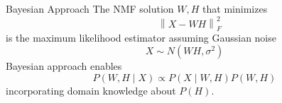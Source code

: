\documentclass[aspectratio=169]{beamer}
\begin{document}

\begin{frame}{Bayesian Approach}
	The NMF solution $W, H$ that minimizes
	\begin{equation*}
	 \quad \left\lVert X - W H\right\rVert^2_F
	\end{equation*}
	is the maximum likelihood estimator assuming Gaussian noise
	\begin{equation*}
	X \sim N( W H, \sigma^2)
	\end{equation*}
	Bayesian approach enables 
	\begin{equation*}
	P(W, H \mid X) \propto  P(X \mid W, H ) P(W, H)
	\end{equation*}
	incorporating domain knowledge about $P(H) $.
\end{frame}
\end{document}
